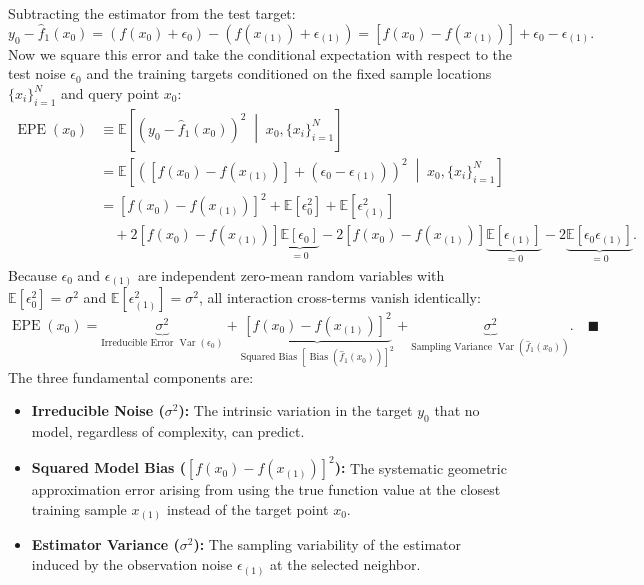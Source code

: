 \documentclass[11pt,a4paper]{article}
\begin{document}
Subtracting the estimator from the test target:
\[
  y_0 - \hat{f}_1(x_0) = \left( f(x_0) + \epsilon_0 \right) - \left( f(x_{(1)}) + \epsilon_{(1)} \right) = \left[ f(x_0) - f(x_{(1)}) \right] + \epsilon_0 - \epsilon_{(1)}.
\]
Now we square this error and take the conditional expectation with respect to the test noise $\epsilon_0$ and the training targets conditioned on the fixed sample locations $\{x_i\}_{i=1}^N$ and query point $x_0$:
\begin{align*}
  \operatorname{EPE}(x_0) &\equiv \mathbb{E}\left[ (y_0 - \hat{f}_1(x_0))^2 \;\middle|\; x_0, \{x_i\}_{i=1}^N \right] \\
  &= \mathbb{E}\left[ \left( [f(x_0) - f(x_{(1)})] + (\epsilon_0 - \epsilon_{(1)}) \right)^2 \;\middle|\; x_0, \{x_i\}_{i=1}^N \right] \\
  &= \left[ f(x_0) - f(x_{(1)}) \right]^2 + \mathbb{E}[\epsilon_0^2] + \mathbb{E}[\epsilon_{(1)}^2] \\
  &\quad + 2\left[ f(x_0) - f(x_{(1)}) \right] \underbrace{\mathbb{E}[\epsilon_0]}_{=0} - 2\left[ f(x_0) - f(x_{(1)}) \right] \underbrace{\mathbb{E}[\epsilon_{(1)}]}_{=0} - 2\underbrace{\mathbb{E}[\epsilon_0 \epsilon_{(1)}]}_{=0}.
\end{align*}
Because $\epsilon_0$ and $\epsilon_{(1)}$ are independent zero-mean random variables with $\mathbb{E}[\epsilon_0^2] = \sigma^2$ and $\mathbb{E}[\epsilon_{(1)}^2] = \sigma^2$, all interaction cross-terms vanish identically:
\[
  \operatorname{EPE}(x_0) = \underbrace{\sigma^2}_{\text{Irreducible Error } \operatorname{Var}(\epsilon_0)} + \underbrace{\left[ f(x_0) - f(x_{(1)}) \right]^2}_{\text{Squared Bias } [\operatorname{Bias}(\hat{f}_1(x_0))]^2} + \underbrace{\sigma^2}_{\text{Sampling Variance } \operatorname{Var}(\hat{f}_1(x_0))}. \quad \blacksquare
\]
The three fundamental components are:
\begin{itemize}[itemsep=2pt, leftmargin=18pt]
  \item \textbf{Irreducible Noise ($\sigma^2$):} The intrinsic variation in the target $y_0$ that no model, regardless of complexity, can predict.
  \item \textbf{Squared Model Bias ($[f(x_0) - f(x_{(1)})]^2$):} The systematic geometric approximation error arising from using the true function value at the closest training sample $x_{(1)}$ instead of the target point $x_0$.
  \item \textbf{Estimator Variance ($\sigma^2$):} The sampling variability of the estimator induced by the observation noise $\epsilon_{(1)}$ at the selected neighbor.
\end{itemize}
\end{document}
